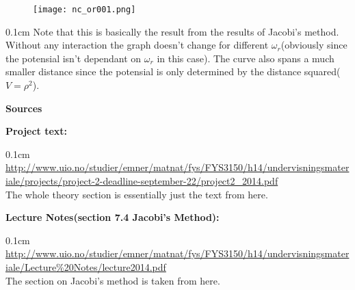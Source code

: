 \documentclass[11pt, a4 paper]{report}
\newenvironment{tabbed}{\begin{addmargin}{0.1cm}}{\end{addmargin}}
\newcommand{\sectiontitle}[1]{\begin{center} \Large\textbf{{#1}} \end{center}}
\newcommand{\sectionundertitle}[1]{\hspace{-0.5cm} \textbf{{#1}}}
\newcommand{\vsp}{\vspace{0.2cm}}
\begin{document}
    \begin{figure}[H]
        \centering
        \texttt{[image: nc\_or001.png]}
    \end{figure}
    \begin{tabbed}
        Note that this is basically the result from the results of Jacobi's method.\vsp\\
        Without any interaction the graph doesn't change for different $\omega_r$(obviously since the potensial isn't dependant on $\omega_r$ in this case). The curve also spans a much smaller distance since the potensial is only determined by the distance squared($V=\rho^2$).
    \end{tabbed}

\sectiontitle{Sources}
    \sectionundertitle{Project text:}
    \begin{tabbed}
        \url{http://www.uio.no/studier/emner/matnat/fys/FYS3150/h14/undervisningsmateriale/projects/project-2-deadline-september-22/project2_2014.pdf}\\
        The whole theory section is essentially just the text from here.\vsp\\
    \end{tabbed}
    \sectionundertitle{Lecture Notes(section 7.4 Jacobi's Method):}
    \begin{tabbed}
        \url{http://www.uio.no/studier/emner/matnat/fys/FYS3150/h14/undervisningsmateriale/Lecture%20Notes/lecture2014.pdf}
        \\
        The section on Jacobi's method is taken from here.\vsp\\
    \end{tabbed}
\end{document}
